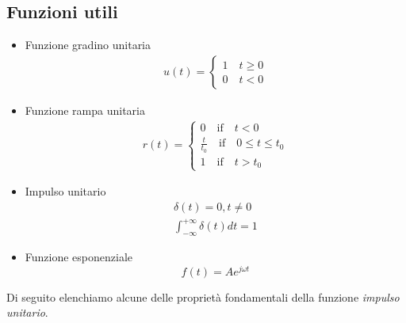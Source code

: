 \documentclass[a4paper, titlepage]{article}
\begin{document}
\subsection{Funzioni utili}
\begin{itemize}
	\item Funzione gradino unitaria
	\begin{align*}
	u(t)=\left\{
		\begin{array}{ll}
		1 \quad t\geq0\\
		0 \quad t<0
		\end{array}
		\right.
	\end{align*}
	
	\item Funzione rampa unitaria
	\begin{align*}
	r(t)=\left\{
	\begin{array}{ll}
	0  \quad \text{if} \quad t<0\\
	\frac{t}{t_{0}} \quad  \text{if} \quad 0\leq t\leq t_{0}\\
	1 \quad \text{if} \quad t>t_{0}
	\end{array}
	\right.
	\end{align*}
	
	\item Impulso unitario
	\begin{align*}
	\delta(t)=0,t\neq0\\
	\int_{-\infty}^{+\infty}\delta(t)dt=1
	\end{align*}
	
	\item Funzione esponenziale
	$$f(t)=Ae^{j\omega t}$$
\end{itemize}
Di seguito elenchiamo alcune delle proprietà fondamentali della funzione \textit{impulso unitario}.
\end{document}
